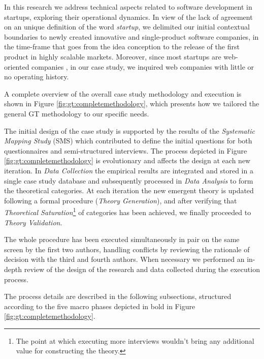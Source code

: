 \documentclass[10pt,journal,letterpaper,compsoc]{IEEEtran}
\begin{document}
In this research we address technical aspects related to software development in startups, exploring their operational dynamics. In view of the lack of agreement on an unique definition of the word \textit{startup}, we delimited our initial contextual boundaries to newly created innovative and single-product software companies, in the time-frame that goes from the idea conception to the release of the first product in highly scalable markets. Moreover, since most startups are web-oriented companies \cite{tc-webstartups-link, Allen2003}, in our case study, we inquired web companies with little or no operating history.

A complete overview of the overall case study methodology and execution is shown in Figure \ref{fig:gt:completemethodology}, which presents how we tailored the general GT methodology to our specific needs.


The initial design of the case study is supported by the results of the \textit{Systematic Mapping Study} (SMS) \cite{SMS} which contributed to define the initial questions for both questionnaires and semi-structured interviews. The process depicted in Figure \ref{fig:gt:completemethodology} is evolutionary and affects the design at each new iteration. In \textit{Data Collection} the empirical results are integrated and stored in a single case study database and subsequently processed in \textit{Data Analysis} to form the theoretical categories.  At each iteration the new emergent theory is updated following a formal procedure (\textit{Theory Generation}), and after verifying that \textit{Theoretical Saturation}\footnote{The point at which executing more interviews wouldn't bring any additional value for constructing the theory.} of categories has been achieved, we finally proceeded to \textit{Theory Validation}. 

The whole procedure has been executed simultaneously in pair on the same screen by the first two authors, handling conflicts by reviewing the rationale of decision with the third and fourth authors. When necessary we performed an in-depth review of the design of the research and data collected during the execution process. 

The process details are described in the following subsections, structured according to the five macro phases depicted in bold in Figure \ref{fig:gt:completemethodology}.



\end{document}
